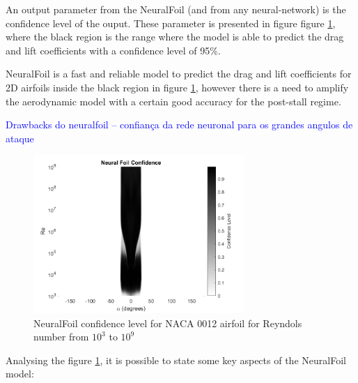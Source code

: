 An output parameter from the NeuralFoil (and from any neural-network) is the confidence level of the ouput. These parameter is presented in figure figure \ref{fig:neuralfoil_confidence}, where the black region is the range where the model is able to predict the drag and lift coefficients with a confidence level of 95\%. 

NeuralFoil \cite{sharpe_neuralfoil_nodate} is a fast and reliable model to predict the drag and lift coefficients for 2D airfoils inside the black region in figure \ref{fig:neuralfoil_confidence}, however there is a need to amplify the aerodynamic model with a certain good accuracy for the post-stall regime.

\textcolor{blue}{Drawbacks do neuralfoil – confiança da rede neuronal para os grandes angulos de ataque}\\

\begin{figure}[!htb]
    \centering
    \includegraphics[width=8cm]{Figures/background/aero/NeuralFoil_Confidence_2D_black.png}
    \caption{NeuralFoil confidence level for NACA 0012 airfoil for Reyndols number from $10^3$ to $10^9$}
    \label{fig:neuralfoil_confidence}
\end{figure}

Analysing the figure \ref{fig:neuralfoil_confidence}, it is possible to state some key aspects of the NeuralFoil model:


